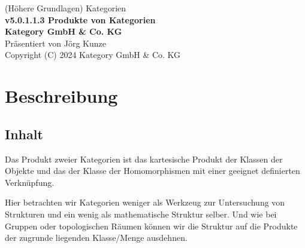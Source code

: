 \documentclass[a4paper]{amsart}
\theoremstyle{definition}
\begin{document}
\begin{titlepage}
\centering
{\huge
(Höhere Grundlagen) Kategorien\\[1cm]
\textbf{v5.0.1.1.3 Produkte von Kategorien}
}\\[1cm]

\textbf{Kategory GmbH \& Co. KG}\\
Präsentiert von Jörg Kunze\\
Copyright (C) 2024 Kategory GmbH \& Co. KG

\end{titlepage}

%

\newpage

\section*{Beschreibung}

\subsection*{Inhalt}
Das Produkt zweier Kategorien ist das kartesische Produkt der Klassen der Objekte und das der Klasse der Homomorphismen mit einer geeignet definierten Verknüpfung.

Hier betrachten wir Kategorien weniger als Werkzeug zur Untersuchung von Strukturen und ein wenig als mathematische Struktur selber. Und wie bei Gruppen oder topologischen Räumen können wir die Struktur auf die Produkte der zugrunde liegenden Klasse/Menge ausdehnen.
\end{document}
